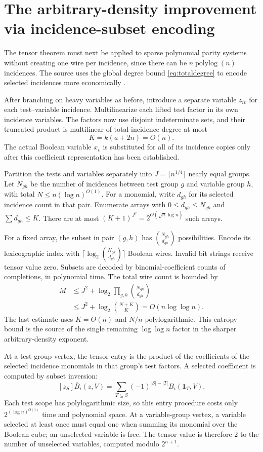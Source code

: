 \documentclass[11pt,a4paper]{article}
\numberwithin{equation}{section}
\theoremstyle{definition}
\theoremstyle{remark}
\newcommand{\one}{\mathbf 1}
\begin{document}
\section{The arbitrary-density improvement via incidence-subset encoding}
\label{sec:tensordense}
The tensor theorem must next be applied to sparse polynomial parity systems
without creating one wire per incidence, since there can be
$n\operatorname{polylog}(n)$ incidences. The source uses the global degree bound
\eqref{eq:totaldegree} to encode selected incidences more economically
\cite{quant-reduction}.

After branching on heavy variables as before, introduce a separate variable
$z_{iv}$ for each test--variable incidence. Multilinearize each lifted test
factor in its own incidence variables. The factors now use disjoint
indeterminate sets, and their truncated product is multilinear of total
incidence degree at most
\[
 K=k(a+2n)=O(n).
\]
The actual Boolean variable $x_v$ is substituted for all of its incidence
copies only after this coefficient representation has been established.

Partition the tests and variables separately into
$J=\lceil n^{1/4}\rceil$ nearly equal groups. Let $N_{gh}$ be the number of
incidences between test group $g$ and variable group $h$, with total
$N\le n(\log n)^{O(1)}$. For a monomial, write $d_{gh}$ for its selected
incidence count in that pair. Enumerate arrays with
$0\le d_{gh}\le N_{gh}$ and $\sum d_{gh}\le K$. There are at most
$(K+1)^{J^2}=2^{O(\sqrt n\log n)}$ such arrays.

For a fixed array, the subset in pair $(g,h)$ has
$\binom{N_{gh}}{d_{gh}}$ possibilities. Encode its lexicographic index with
$\lceil\log_2\binom{N_{gh}}{d_{gh}}\rceil$ Boolean wires. Invalid bit strings
receive tensor value zero. Subsets are decoded by binomial-coefficient counts
of completions, in polynomial time. The total wire count is bounded by
\begin{align}\label{eq:wirecount}
 M&\le J^2+\log_2\prod_{g,h}\binom{N_{gh}}{d_{gh}}\\
  &\le J^2+\log_2\binom{N+K}{K}
   =O(n\log\log n).\nonumber
\end{align}
The last estimate uses $K=\Theta(n)$ and $N/n$ polylogarithmic.
This entropy bound is the source of the single remaining $\log\log n$
factor in the sharper arbitrary-density exponent.

At a test-group vertex, the tensor entry is the product of the coefficients
of the selected incidence monomials in that group's test factors. A selected
coefficient is computed by subset inversion:
\[
 [z_S]\overline B_i(z,V)
   =\sum_{T\subseteq S}(-1)^{|S|-|T|}B_i(\one_T,V).
\]
Each test scope has polylogarithmic size, so this entry procedure costs only
$2^{(\log n)^{O(1)}}$ time and polynomial space.
At a variable-group vertex, a variable selected at least once must equal one
when summing its monomial over the Boolean cube; an unselected variable is
free. The tensor value is therefore $2$ to the number of unselected variables,
computed modulo $2^{n+1}$.
\end{document}
